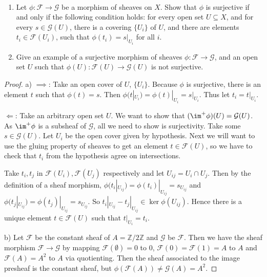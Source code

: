 \begin{exercise}%
	~
	\begin{enumerate}
		\item Let $\phi :\mathcal{F}\to \mathcal{G} $ be a morphism of sheaves on $X $. Show that $\phi  $ is surjective if and only if the following condition holds: for every open set $U \subseteq X $, and for every $s \in \mathcal{G}(U) $, there is a covering $\{U_i\}   $ of $U $, and there are elements $t_i \in \mathcal{F}(U_i) $, such that $\phi (t_i) = s|_{U_i} $ for all $i $.
		\item Give an example of a surjective morphism of sheaves $\phi : \mathcal{F}\to \mathcal{G} $, and an open set $U $ such that $\phi (U): \mathcal{F}(U) \to \mathcal{G}(U) $ is not surjective.
	\end{enumerate}
\end{exercise}
\begin{proof}
	a) $\implies $: Take an open cover of $U $, $\{U_i\}   $.
	Because $\phi  $ is surjective, there is an element $t $ such that $\phi (t) = s $.
	Then $\phi (t|_{U_i}) = \phi(t)|_{U_i} = s|_{U_i} $.
	Thus let $t_i = t|_{U_i} $.

	$\Leftarrow $: Take an arbitrary open set $U $.
	We want to show that $(\im^+ \phi)(U) = \mathcal{G}(U) $.
	As $\im^+ \phi $ is a subsheaf of $\mathcal{G} $, all we need to show is surjectivity.
	Take some $s \in \mathcal{G}(U) $.
	Let $U_i $ be the open cover given by hypothesis.
	Next we will want to use the gluing property of sheaves to get an element $t \in \mathcal{F}(U) $, so we have to check that $t_i $ from the hypothesis agree on intersections.

	Take $t_i,t_j $ in $\mathcal{F}(U_i),\mathcal{F}(U_j) $ respectively and let $U_{ij} = U_i \cap U_j $.
	Then by the definition of a sheaf morphism, $\phi(t_i|_{U_{ij}}) = \phi(t_i)|_{U_{ij}} = s_{U_{ij}} $ and $\phi(t_j|_{U_{ij}}) = \phi(t_j)|_{U_{ij}} = s_{U_{ij}}$.
	So $t_i|_{U_{ij}}-t_{j}|_{U_{ij}} \in \ker \phi(U_{ij}) $.
	Hence there is a unique element $t\in \mathcal{F}(U)$ such that $t|_{U_i} = t_i $.

	b) Let $\mathcal{F} $ be the constant sheaf of $A = \mathbb{Z} / 2\mathbb{Z} $ and $\mathcal{G} $ be $\mathcal{F} $.
	Then we have the sheaf morphism $\mathcal{F} \to \mathcal{G} $ by mapping $\mathcal{F}(\emptyset) = 0$ to 0, $\mathcal{F}(0)= \mathcal{F}(1) = A$ to $A $ and $\mathcal{F}(A) = A^2 $ to $A $ via quotienting.
	Then the sheaf associated to the image presheaf is the constant sheaf, but $\phi(\mathcal{F}(A)) \ne \mathcal{G}(A) = A^2$.
\end{proof}

